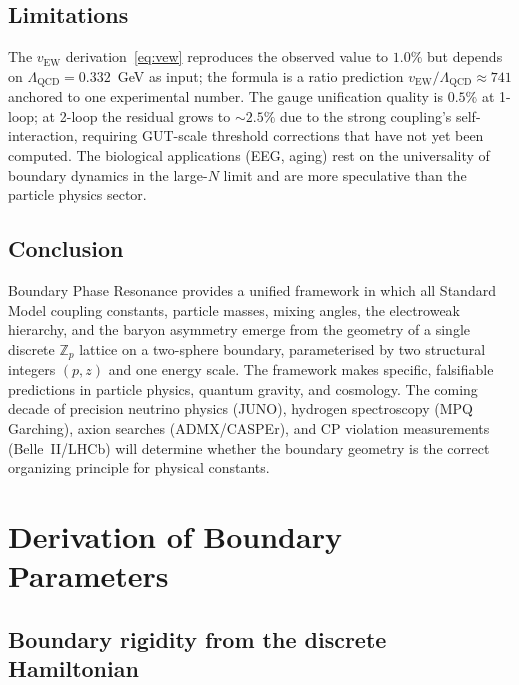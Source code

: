 \documentclass[aps,prd,twocolumn,superscriptaddress,longbibliography,nofootinbib]{revtex4-2}
\newcommand{\Zp}{\mathbb{Z}_p}
\newcommand{\vEW}{v_{\mathrm{EW}}}
\begin{document}
\subsection{Limitations}

The $\vEW$ derivation~\eqref{eq:vew} reproduces the observed value to $1.0\%$
but depends on $\Lambda_{\mathrm{QCD}} = 0.332$~GeV as input; the formula is
a ratio prediction $\vEW/\Lambda_{\mathrm{QCD}} \approx 741$ anchored to one
experimental number.  The gauge unification quality is $0.5\%$ at 1-loop;
at 2-loop the residual grows to $\sim2.5\%$ due to the strong coupling's
self-interaction, requiring GUT-scale threshold corrections that have not yet
been computed.  The biological applications (EEG, aging) rest on the
universality of boundary dynamics in the large-$N$ limit and are more
speculative than the particle physics sector.

\subsection{Conclusion}

Boundary Phase Resonance provides a unified framework in which all Standard
Model coupling constants, particle masses, mixing angles, the electroweak
hierarchy, and the baryon asymmetry emerge from the geometry of a single
discrete $\Zp$ lattice on a two-sphere boundary, parameterised by two
structural integers $(p, z)$ and one energy scale.  The framework makes
specific, falsifiable predictions in particle physics, quantum gravity,
and cosmology.  The coming decade of precision neutrino physics (JUNO),
hydrogen spectroscopy (MPQ Garching), axion searches (ADMX/CASPEr), and
CP violation measurements (Belle~II/LHCb) will determine whether the
boundary geometry is the correct organizing principle for physical constants.


\appendix

\section{Derivation of Boundary Parameters}
\label{app:derivations}

\subsection{Boundary rigidity from the discrete Hamiltonian}
\end{document}

